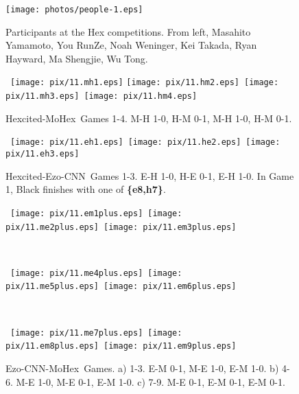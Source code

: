 \documentclass{article}
\def\Ec{\mbox{\sc Ezo-CNN}}
\def\Hite{\mbox{\sc Hexcited}}
\def\Mx{\mbox{\sc MoHex}}
\begin{document}
\begin{figure}[hbt]
\texttt{[image: photos/people-1.eps]}\
\caption{Participants at the Hex competitions. From left,
Masahito Yamamoto,
You RunZe,
Noah Weninger,
Kei Takada,
Ryan Hayward,
Ma Shengjie,
Wu Tong.} \end{figure}


\begin{figure}[htp]
\noindent\hspace*{-1cm}\
\texttt{[image: pix/11.mh1.eps]}\hspace*{-1cm}
\texttt{[image: pix/11.hm2.eps]}\hspace*{-1cm}\
\texttt{[image: pix/11.mh3.eps]}\hspace*{-1cm}\
\texttt{[image: pix/11.hm4.eps]}
\caption{\Hite-\Mx\ Games 1-4. M-H 1-0, H-M 0-1, M-H 1-0, H-M 0-1.}
\end{figure}


\begin{figure}[hbp]
\noindent\
\texttt{[image: pix/11.eh1.eps]}\hspace*{-1cm}\
\texttt{[image: pix/11.he2.eps]}\hspace*{-1cm}\
\texttt{[image: pix/11.eh3.eps]}
\caption{\Hite-\Ec\ Games 1-3. E-H 1-0, H-E 0-1, E-H 1-0.
In Game 1, Black finishes with one of {\bf \{e8,h7\}}.}
\end{figure}

\begin{figure}[hbp]
\noindent\
\texttt{[image: pix/11.em1plus.eps]}\hspace*{-1cm}\
\texttt{[image: pix/11.me2plus.eps]}\hspace*{-1cm}\
\texttt{[image: pix/11.em3plus.eps]}

~

\noindent\
\texttt{[image: pix/11.me4plus.eps]}\hspace*{-1cm}\
\texttt{[image: pix/11.me5plus.eps]}\hspace*{-1cm}\
\texttt{[image: pix/11.em6plus.eps]}

~

\noindent\
\texttt{[image: pix/11.me7plus.eps]}\hspace*{-1cm}\
\texttt{[image: pix/11.em8plus.eps]}\hspace*{-1cm}\
\texttt{[image: pix/11.em9plus.eps]}
\caption{\Ec-\Mx\ Games.
a) 1-3. E-M 0-1, M-E 1-0, E-M 1-0.
b) 4-6. M-E 1-0, M-E 0-1, E-M 1-0.
c) 7-9. M-E 0-1, E-M 0-1, E-M 0-1.}
\label{fig:EM11}
\end{figure}
\end{document}
